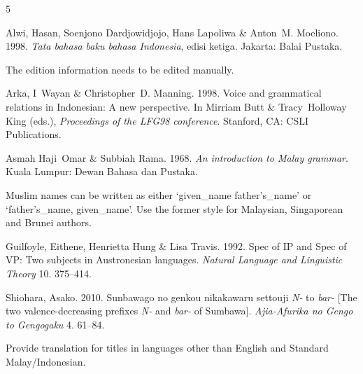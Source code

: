 \documentclass{nusaart}
\begin{document}
% 
\begin{thebibliography}{5}
\providecommand{\natexlab}[1]{#1}

Alwi, Hasan, Soenjono Dardjowidjojo, Hans Lapoliwa \& Anton~M. Moeliono. 1998.
\newblock \emph{Tata bahasa baku bahasa {I}ndonesia}\textsf{, edisi ketiga}.
\newblock Jakarta: Balai Pustaka.
\newblock \par \textsf{The edition information needs to be edited manually.}

Arka, I~Wayan \& Christopher~D. Manning. 1998.
\newblock Voice and grammatical relations in {I}ndonesian: A new perspective.
\newblock In Mirriam Butt \& Tracy~Holloway King (eds.), \emph{Proceedings of
  the {LFG98} conference}. Stanford, CA: CSLI Publications.

  \textsf{Asmah Haji~Omar} \& Subbiah Rama. 1968.
\newblock \emph{An introduction to {M}alay grammar}.
\newblock Kuala Lumpur: Dewan Bahasa dan Pustaka.
\newblock \par \textsf{Muslim names can be written as either `given\_name father's\_name' or `father's\_name, given\_name'.  Use the former style for Malaysian, Singaporean and Brunei authors.}

Guilfoyle, Eithene, Henrietta Hung \& Lisa Travis. 1992.
\newblock Spec of {IP} and {S}pec of {VP}: Two subjects in {A}ustronesian
  languages.
\newblock \emph{Natural Language and Linguistic Theory} 10. 375--414.

Shiohara, Asako. 2010.
\newblock Sunbawago no genkou nikakawaru settouji \textit{N-} to \textit{bar-}
 \textsf{[The two valence-decreasing prefixes \textit{N-} and \textit{bar-} of
 {S}umbawa]}.
\newblock \emph{Ajia-Afurika no Gengo to Gengogaku} 4. 61--84.
\newblock \par \textsf{Provide translation for titles in languages other than English and Standard Malay/Indonesian.}

\end{thebibliography}
\end{document}
